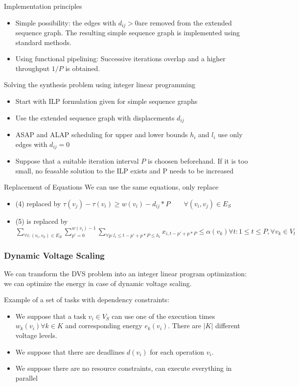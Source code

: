 Implementation principles
\begin{itemize}[noitemsep]
\item Simple possibility: the edges with $d_{ij} > 0$are removed from the extended sequence graph. The resulting simple sequence graph is implemented using standard methods.
\item Using functional pipelining: Successive iterations overlap and a higher throughput $1/P$ is obtained.
\end{itemize}

Solving the synthesis problem using  integer linear programming

\begin{itemize}[noitemsep]
\item Start with ILP formulation given for simple sequence graphs
\item Use the extended sequence graph with displacements $d_{ij}$
\item ASAP and ALAP scheduling for upper and lower bounds $h_i$ and $l_i$ use only edges with $d_{ij} = 0$
\item Suppose that a suitable iteration interval $P$ is choosen beforehand. If it is too small, no feasable solution to the ILP exists and P needs to be increased
\end{itemize}


Replacement of Equations
We can use the same equations, only replace 

\begin{itemize}[noitemsep]
\item (4) replaced by $\tau(v_j) - \tau(v_i) \geq w(v_i) - d_{ij} * P \qquad \forall (v_i, v_j ) \in E_S$
\item (5) is replaced by $ \sum_{\forall i : (v_i, v_k) \in E_R} \sum_{ p' = 0 }^{ w(v_i) -1} \sum_{\forall p : l_i \leq t - p' + p * P \leq h_i} x_{i, t-p'+p*P} \leq \alpha (v_k) \forall t: 1 \leq t \leq P, \forall v_k \in V_t$
\end{itemize}

\subsubsection{Dynamic Voltage Scaling}
We can transform the DVS problem into an integer linear program optimization: we can optimize the energy in case of dynamic voltage scaling.


Example of a set of tasks with dependency constraints:
\begin{itemize}[noitemsep]
\item We suppose that a task $v_i \in V_S$ can use one of the execution times $w_k(v_i) \forall k \in K$ and corresponding energy $e_k(v_i)$. There are $|K|$ different voltage levels.
\item We suppose that there are deadlines $d(v_i)$ for each operation $v_i$.
\item We suppose there are no resource constraints, can execute everything in parallel
\end{itemize}


